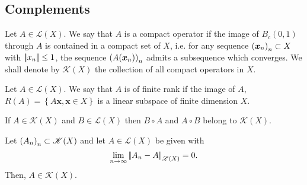 \documentclass{article}
\begin{document}
\subsection{Complements}
\begin{definition}
	Let $A\in\mathscr{L}(X)$. We say that $A$ is a compact operator if the image of $B_{c}(0,1)$ through $A$ is contained in a compact set of $X$, i.e. for any sequence ${\left({\bm{x}}_{n}\right)}_{n}\subset X$ with $\left|\negthinspace\left|x_{n}\right|\negthinspace\right|\leq1$, the sequence ${\left(A(\bm{x}_{n})\right)}_{n}$ admits a subsequence which converges. We shall denote by $\mathscr{K}(X)$ the collection of all compact operators in $X$.
\end{definition}
\begin{definition}
	Let $A\in\mathscr{L}(X)$. We say that $A$ is of finite rank if the image of $A$, $R(A)=\left\{A\bm{x},\bm{x}\in X\right\}$ is a linear subspace of finite dimension $X$.
\end{definition}
\begin{lemma}
	If $A\in\mathscr{K}(X)$ and $B\in\mathscr{L}(X)$ then $B\circ A$ and $A\circ B$ belong to $\mathscr{K}(X)$.
\end{lemma}
\begin{proposition}
	Let ${\left({A}_{n}\right)}_{n}\subset\mathscr{K}(X)$ and let $A\in\mathscr{L}(X)$ be given with
	\begin{equation*}
		\lim_{n\to\infty}\left|\negthinspace\left|A_{n}-A\right|\negthinspace\right|_{\mathscr{L}(X)}=0.
	\end{equation*}
	Then, $A\in\mathscr{K}(X)$.
\end{proposition}
\end{document}
